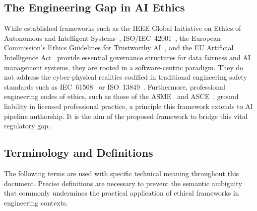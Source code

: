 ﻿\documentclass[11pt,a4paper]{article}
\begin{document}
\subsection{The Engineering Gap in AI Ethics}
While established frameworks such as the \ac{IEEE} Global Initiative on Ethics of Autonomous and Intelligent Systems~\cite{ieee_ethically_aligned}, \ac{ISO}/\ac{IEC}~42001~\cite{iso42001}, the European Commission's Ethics Guidelines for Trustworthy AI~\cite{eu_hleg2019}, and the EU Artificial Intelligence Act~\cite{eu_ai_act2024} provide essential governance structures for data fairness and AI management systems, they are rooted in a software-centric paradigm. They do not address the cyber-physical realities codified in traditional engineering safety standards such as IEC~61508~\cite{iec61508} or ISO~13849~\cite{iso13849}. Furthermore, professional engineering codes of ethics, such as those of the \ac{ASME}~\cite{asme_ethics} and \ac{ASCE}~\cite{asce_ethics}, ground liability in licensed professional practice, a principle this framework extends to AI pipeline authorship. It is the aim of the proposed framework to bridge this vital regulatory gap.

\subsection{Terminology and Definitions}
\label{sec:terminology}
The following terms are used with specific technical meaning throughout this document. Precise definitions are necessary to prevent the semantic ambiguity that commonly undermines the practical application of ethical frameworks in engineering contexts.
\end{document}
